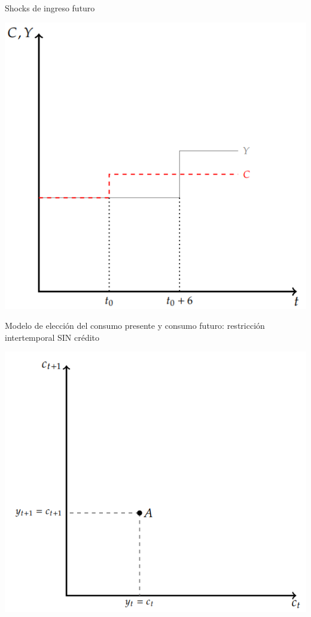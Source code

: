 \documentclass{beamer}
\begin{document}
\begin{frame}{Shocks de ingreso futuro}
    \begin{center}
        \includegraphics[scale=0.7]{../Figures/C35.3.png} 
    \end{center} 
\end{frame}

\begin{frame}{Modelo de elección del consumo presente y consumo futuro: restricción intertemporal SIN crédito}
    \begin{center}
        \includegraphics[scale=0.7]{../Figures/C35.4.png} 
    \end{center} 
\end{frame}
\end{document}

